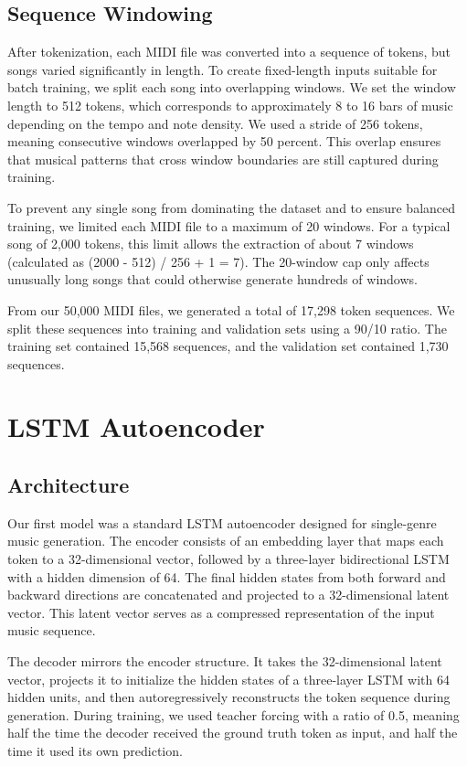 \documentclass{article}
\theoremstyle{plain}
\theoremstyle{definition}
\theoremstyle{remark}
\begin{document}
\subsection{Sequence Windowing}
After tokenization, each MIDI file was converted into a sequence of tokens, but songs varied significantly in length. To create fixed-length inputs suitable for batch training, we split each song into overlapping windows. We set the window length to 512 tokens, which corresponds to approximately 8 to 16 bars of music depending on the tempo and note density. We used a stride of 256 tokens, meaning consecutive windows overlapped by 50 percent. This overlap ensures that musical patterns that cross window boundaries are still captured during training.

To prevent any single song from dominating the dataset and to ensure balanced training, we limited each MIDI file to a maximum of 20 windows. For a typical song of 2,000 tokens, this limit allows the extraction of about 7 windows (calculated as (2000 - 512) / 256 + 1 = 7). The 20-window cap only affects unusually long songs that could otherwise generate hundreds of windows.

From our 50,000 MIDI files, we generated a total of 17,298 token sequences. We split these sequences into training and validation sets using a 90/10 ratio. The training set contained 15,568 sequences, and the validation set contained 1,730 sequences.

\section{LSTM Autoencoder}
\subsection{Architecture}
Our first model was a standard LSTM autoencoder designed for single-genre music generation. The encoder consists of an embedding layer that maps each token to a 32-dimensional vector, followed by a three-layer bidirectional LSTM with a hidden dimension of 64. The final hidden states from both forward and backward directions are concatenated and projected to a 32-dimensional latent vector. This latent vector serves as a compressed representation of the input music sequence.

The decoder mirrors the encoder structure. It takes the 32-dimensional latent vector, projects it to initialize the hidden states of a three-layer LSTM with 64 hidden units, and then autoregressively reconstructs the token sequence during generation. During training, we used teacher forcing with a ratio of 0.5, meaning half the time the decoder received the ground truth token as input, and half the time it used its own prediction.
\end{document}
